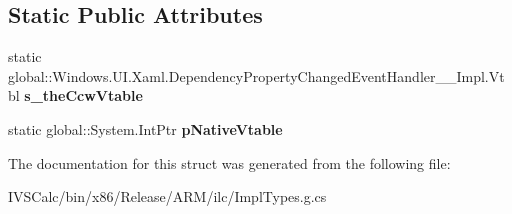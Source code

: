 \subsection*{Static Public Attributes}
\begin{DoxyCompactItemize}
\item 
\mbox{\label{struct_windows_1_1_u_i_1_1_xaml_1_1_dependency_property_changed_event_handler_____impl_1_1_vtbl_aedf1126c922a18a75718a29b7ef95ff9}} 
static global\+::\+Windows.\+U\+I.\+Xaml.\+Dependency\+Property\+Changed\+Event\+Handler\+\_\+\+\_\+\+Impl.\+Vtbl {\bfseries s\+\_\+the\+Ccw\+Vtable}
\item 
\mbox{\label{struct_windows_1_1_u_i_1_1_xaml_1_1_dependency_property_changed_event_handler_____impl_1_1_vtbl_ab0b23c9eaa9dae8c8a5852265815bd50}} 
static global\+::\+System.\+Int\+Ptr {\bfseries p\+Native\+Vtable}
\end{DoxyCompactItemize}


The documentation for this struct was generated from the following file\+:\begin{DoxyCompactItemize}
\item 
I\+V\+S\+Calc/bin/x86/\+Release/\+A\+R\+M/ilc/Impl\+Types.\+g.\+cs\end{DoxyCompactItemize}
